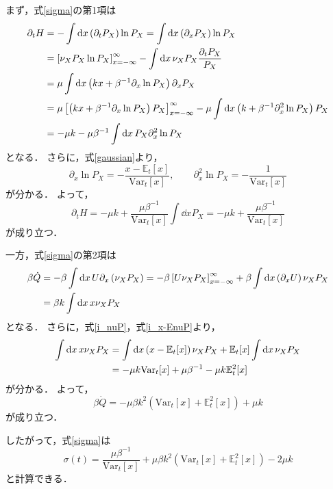 \documentclass[a4paper,11pt]{jsarticle}
\begin{document}
まず，式\eqref{sigma}の第1項は
\begin{align}
  \partial_t H 
  &= - \int \dd{x} \left(\partial_t P_X\right) \ln{P_X} 
  = \int \dd{x} \left(\partial_x P_X\right) \ln{P_X} \notag\\
  &= \left[\nu_X P_X \ln{P_X}\right]_{x=-\infty}^{\infty} - \int \dd{x} \nu_X P_X \frac{\partial_t P_X}{P_X} \notag\\
  &= \mu \int \dd{x} \left(kx + \beta^{-1}\partial_x \ln{P_X}\right)\partial_xP_X \notag\\
  &= \mu\left[\left(kx + \beta^{-1}\partial_x \ln{P_X}\right)P_X\right]_{x=-\infty}^{\infty} - \mu \int \dd{x} \left(k + \beta^{-1}\partial_x^2 \ln{P_X}\right)P_X \notag\\
  &= -\mu k - \mu \beta^{-1} \int \dd{x} P_X \partial_x^2 \ln{P_X}
\end{align}
となる．
さらに，式\eqref{gaussian}より，
\begin{equation}
  \partial_x \ln{P_X} = - \frac{x-\mathbb{E}_t[x]}{\mathrm{Var}_t[x]}, \qquad \partial_x^2 \ln{P_X} = - \frac{1}{\mathrm{Var}_t[x]}
\end{equation}
が分かる．
よって，
\begin{equation}
  \partial_t H = -\mu k + \frac{\mu\beta^{-1}}{\mathrm{Var}_t[x]} \int \dd{x} P_X = -\mu k + \frac{\mu\beta^{-1}}{\mathrm{Var}_t[x]} 
\end{equation}
が成り立つ．

一方，式\eqref{sigma}の第2項は
\begin{align}
  \beta\dot{Q} 
  &= -\beta \int \dd{x} U\partial_x\left(\nu_X P_X\right) 
  = -\beta \left[U\nu_X P_X\right]_{x=-\infty}^{\infty} + \beta \int \dd{x} \left(\partial_x U\right) \nu_X P_X \notag\\
  &= \beta k \int \dd{x} x\nu_X P_X
\end{align}
となる．
さらに，式\eqref{i_nuP}，式\eqref{i_x-EnuP}より，
\begin{align}
  \int \dd{x} x\nu_X P_X 
  &= \int \dd{x} \left(x-\mathbb{E}_t[x]\right)\nu_X P_X + \mathbb{E}_t[x] \int \dd{x} \nu_X P_X \notag\\
  &= -\mu k \mathrm{Var}_t[x] + \mu\beta^{-1} -\mu k \mathbb{E}_t^2[x]
\end{align}
が分かる．
よって，
\begin{equation}
  \beta \dot{Q} = -\mu \beta k^2 \left(\mathrm{Var}_t[x] + \mathbb{E}_t^2[x]\right)  + \mu k 
\end{equation}
が成り立つ．

したがって，式\eqref{sigma}は
\begin{equation}
  \sigma(t) = \frac{\mu\beta^{-1}}{\mathrm{Var}_t[x]} + \mu \beta k^2 \left(\mathrm{Var}_t[x] + \mathbb{E}_t^2[x]\right) - 2\mu k \label{sigma2}
\end{equation}
と計算できる．
\end{document}
